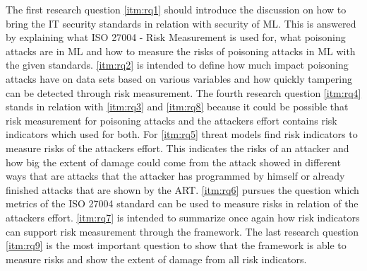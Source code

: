The first research question \ref{itm:rq1} should introduce the discussion on how to bring the IT security standards in relation with security of ML. This is answered by explaining what ISO
27004 - Risk
Measurement is used for, what poisoning attacks are in ML and how to measure the risks of poisoning attacks in ML with the given standards. \ref{itm:rq2} is intended to define how much
impact poisoning
attacks have on data sets based on various variables and how quickly tampering can be detected through risk measurement. The fourth research question \ref{itm:rq4} stands in relation with
\ref{itm:rq3} and \ref{itm:rq8} because it could be possible that risk measurement for poisoning attacks and the attackers effort contains risk indicators which used for both. For
\ref{itm:rq5} threat models find risk indicators to measure risks of the attackers effort. This indicates the risks of an attacker and how big the extent of damage could come from the
attack showed in different ways that are attacks that the attacker has programmed by himself or already finished attacks that are shown by the ART. \ref{itm:rq6} pursues the question which
metrics of the ISO 27004 standard can be used to measure risks in relation of the attackers effort. \ref{itm:rq7} is intended to summarize once again how risk indicators can support risk
measurement through the framework. The last research question \ref{itm:rq9} is the most important question to show that the framework is able to measure risks and show the extent of damage
from all risk indicators.
